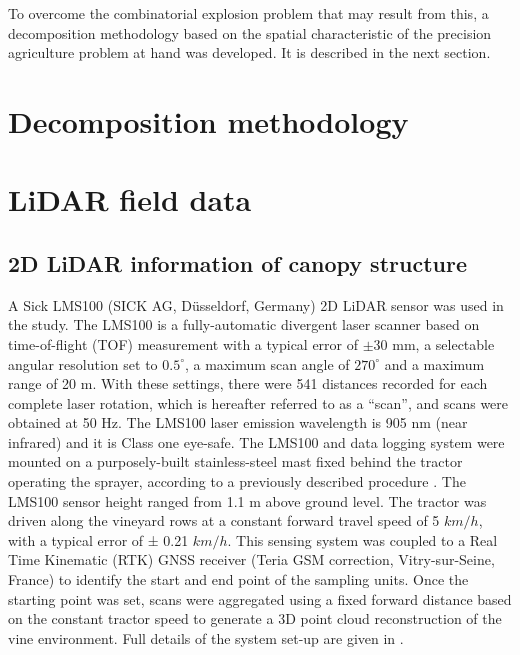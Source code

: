 \documentclass[preprint,3p,times,twocolumn]{elsarticle}
\begin{document}
To overcome the combinatorial explosion problem that may result from this, a decomposition methodology based on the spatial characteristic of the precision agriculture problem at hand was developed. It is described in the next section.


\section{Decomposition methodology}



\section{LiDAR field data}
\label{lidar}


\subsection{2D LiDAR information of canopy structure}
A Sick LMS100 (SICK AG, Düsseldorf, Germany) 2D LiDAR sensor was used in the study. The LMS100 is a fully-automatic divergent laser scanner based on time-of-flight (TOF) measurement with a typical error of $\pm 30$ mm, a selectable angular resolution set to $0.5^{\circ}$, a maximum scan angle of $270^{\circ}$ and a maximum range of 20 m. With these settings, there were 541 distances recorded for each complete laser rotation, which is hereafter referred to as a “scan”, and scans were obtained at 50 Hz. The LMS100 laser emission wavelength is 905 nm (near infrared) and it is Class one eye-safe. The LMS100 and data logging system were mounted on a purposely-built stainless-steel mast fixed behind the tractor operating the sprayer, according to a previously described procedure \cite{cheraiet2020algorithm}. The LMS100 sensor height ranged from 1.1 m above ground level. The tractor was driven along the vineyard rows at a constant forward travel speed of 5 $km/h$, with a typical error of ± 0.21 $km/h$.
This sensing system was coupled to a Real Time Kinematic (RTK) GNSS receiver (Teria GSM correction, Vitry-sur-Seine, France) to identify the start and end point of the sampling units. Once the starting point was set, scans were aggregated using a fixed forward distance based on the constant tractor speed to generate a 3D point cloud reconstruction of the vine environment. %
Full details of the system set-up are given in \cite{cheraiet2020algorithm}.%
\end{document}
